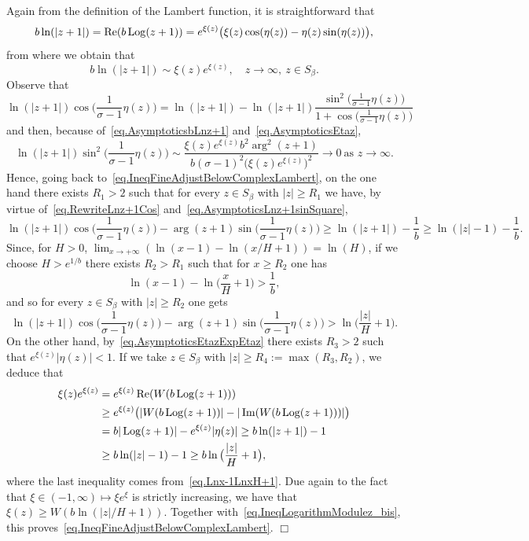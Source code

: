 \documentclass[12pt,leqno]{amsart}
\theoremstyle{plain}
\theoremstyle{definition}
\numberwithin{equation}{section}
\def\Log{\mathop{\rm Log}\nolimits}
\def\Re{\mathop{\rm Re}\nolimits}      %
\def\Im{\mathop{\rm Im}\nolimits}
\newenvironment{proof1}{\medskip\par\noindent{\bf Proof}\ \normalfont}{\hfill $\Box$
\medskip\par}
\begin{document}
\begin{proof1}
\begin{align}
\end{align}
Again from the definition of the Lambert function, it is straightforward that
$$b\ln(|z+1|)=\Re(b\Log(z+1))=e^{\xi(z)}\big(\xi(z)\cos(\eta(z))- \eta(z)\sin(\eta(z))\big),$$
from where we obtain that
\begin{equation}\label{eq.AsymptoticsbLnz+1}
b\ln(|z+1|)\sim \xi(z)e^{\xi(z)},\quad z\to\infty,\ z\in S_{\beta}.
\end{equation}
Observe that
\begin{equation}\label{eq.RewriteLnz+1Cos}
\ln(|z+1|) \cos\big(\frac{1}{\sigma-1}\eta(z)\big)=
\ln(|z+1|) -\ln(|z+1|) \frac{\sin^2\big(\frac{1}{\sigma-1}\eta(z)\big)}{1+ \cos\big(\frac{1}{\sigma-1}\eta(z)\big)}
\end{equation}
and then, because of~\eqref{eq.AsymptoticsbLnz+1} and~\eqref{eq.AsymptoticsEtaz},
\begin{equation}\label{eq.AsymptoticsLnz+1sinSquare}
\ln(|z+1|)\sin^2\big(\frac{1}{\sigma-1}\eta(z)\big)\sim \frac{\xi(z)e^{\xi(z)}b^2\arg^2(z+1)}{b(\sigma-1)^2 \big(\xi(z)e^{\xi(z)}\big)^2}\to 0 \ \text{as }z\to\infty.
\end{equation}
Hence, going back to~\eqref{eq.IneqFineAdjustBelowComplexLambert}, on the one hand there exists $R_1>2$ such that for every $z\in S_{\beta}$ with $|z|\ge R_1$ we have, by virtue of~\eqref{eq.RewriteLnz+1Cos} and~\eqref{eq.AsymptoticsLnz+1sinSquare},
$$
\ln(|z+1|) \cos\big(\frac{1}{\sigma-1}\eta(z)\big)-
\arg(z+1)\sin\big(\frac{1}{\sigma-1}\eta(z)\big)\ge
\ln(|z+1|)-\frac{1}{b}\ge \ln(|z|-1)-\frac{1}{b}.
$$
Since, for $H>0$, $\lim_{x\to +\infty}(\ln(x-1)-\ln(x/H+1))=\ln(H)$, if we choose $H>e^{1/b}$ there exists $R_2>R_1$ such that for $x\ge R_2$ one has
\begin{equation}\label{eq.Lnx-1LnxH+1}
\ln(x-1)-\ln\big(\frac{x}{H}+1\big)>\frac{1}{b},
\end{equation}
and so for every $z\in S_{\beta}$ with $|z|\ge R_2$ one gets
\begin{equation}\label{eq.IneqLogarithmModulez_bis}
\ln(|z+1|) \cos\big(\frac{1}{\sigma-1}\eta(z)\big)-
\arg(z+1)\sin\big(\frac{1}{\sigma-1}\eta(z)\big)>
\ln\big(\frac{|z|}{H}+1\big).
\end{equation}
On the other hand, by~\eqref{eq.AsymptoticsEtazExpEtaz} there exists
$R_3>2$ such that $e^{\xi(z)}|\eta(z)|<1$. If we take $z\in S_{\beta}$ with $|z|\ge R_4:=\max(R_3,R_2)$, we deduce that
\begin{align*}
\xi(z)e^{\xi(z)}&=e^{\xi(z)}\Re(W(b\Log(z+1)))\\
&\ge e^{\xi(z)}\big(|W(b\Log(z+1))|-|\Im(W(b\Log(z+1)))|\big)\\
&= b|\Log(z+1)|-e^{\xi(z)}|\eta(z)|\ge b\ln(|z+1|)-1\\
&\ge b\ln(|z|-1)-1\ge b\ln\big(\frac{|z|}{H}+1\big),
\end{align*}
where the last inequality comes from~\eqref{eq.Lnx-1LnxH+1}. Due again to the fact that $\xi\in(-1,\infty)\mapsto\xi e^{\xi}$ is strictly increasing, we have that $\xi(z)\ge W(b\ln(|z|/H+1))$. Together with~\eqref{eq.IneqLogarithmModulez_bis}, this proves~\eqref{eq.IneqFineAdjustBelowComplexLambert}.
\end{proof1}
\end{document}
